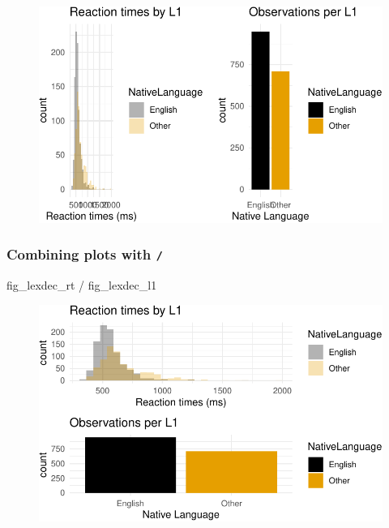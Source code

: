 \documentclass[
  letterpaper,
  DIV=11]{scrartcl}
\newenvironment{Shaded}{\begin{snugshade}}{\end{snugshade}}
\newcommand{\NormalTok}[1]{\textcolor[rgb]{0.00,0.23,0.31}{#1}}
\newcommand{\SpecialCharTok}[1]{\textcolor[rgb]{0.37,0.37,0.37}{#1}}
\theoremstyle{definition}
\theoremstyle{remark}
\begin{document}
\begin{figure}[H]

{\centering \includegraphics{_intro_r_slides_files/figure-pdf/unnamed-chunk-27-1.pdf}

}

\end{figure}

\hypertarget{combining-plots-with-1}{%
\subsubsection{\texorpdfstring{Combining plots with
\texttt{/}}{Combining plots with /}}\label{combining-plots-with-1}}

\begin{Shaded}
\begin{Highlighting}[]
\NormalTok{fig\_lexdec\_rt }\SpecialCharTok{/}\NormalTok{ fig\_lexdec\_l1}
\end{Highlighting}
\end{Shaded}

\begin{figure}[H]

{\centering \includegraphics{_intro_r_slides_files/figure-pdf/unnamed-chunk-28-1.pdf}

}

\end{figure}
\end{document}
